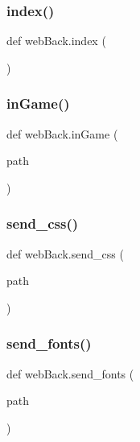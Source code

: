 \hypertarget{namespaceweb_back_aca1190d89e9c6bc7c6624cad8c032bb1}{}\label{namespaceweb_back_aca1190d89e9c6bc7c6624cad8c032bb1} 
\subsubsection{\texorpdfstring{index()}{index()}}
{\footnotesize\ttfamily def web\+Back.\+index (\begin{DoxyParamCaption}{ }\end{DoxyParamCaption})}

\hypertarget{namespaceweb_back_acb08cb868c656ab890c47f4a8862015b}{}\label{namespaceweb_back_acb08cb868c656ab890c47f4a8862015b} 
\subsubsection{\texorpdfstring{in\+Game()}{inGame()}}
{\footnotesize\ttfamily def web\+Back.\+in\+Game (\begin{DoxyParamCaption}\item[{}]{path }\end{DoxyParamCaption})}

\hypertarget{namespaceweb_back_aa3905888cf38ed1374d1adc98c45bca6}{}\label{namespaceweb_back_aa3905888cf38ed1374d1adc98c45bca6} 
\subsubsection{\texorpdfstring{send\+\_\+css()}{send\_css()}}
{\footnotesize\ttfamily def web\+Back.\+send\+\_\+css (\begin{DoxyParamCaption}\item[{}]{path }\end{DoxyParamCaption})}

\hypertarget{namespaceweb_back_adac705fce6dde6308b579f703b3b627f}{}\label{namespaceweb_back_adac705fce6dde6308b579f703b3b627f} 
\subsubsection{\texorpdfstring{send\+\_\+fonts()}{send\_fonts()}}
{\footnotesize\ttfamily def web\+Back.\+send\+\_\+fonts (\begin{DoxyParamCaption}\item[{}]{path }\end{DoxyParamCaption})}

